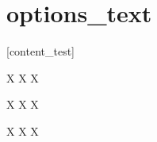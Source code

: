 \part{options_text}[content_test]
    \begin{env_outher}
        X
        X
        X
        \begin{env_inner}
            X
            X
            X
        \end{env_inner}
        X
        X
        X
    \end{env_outher}
